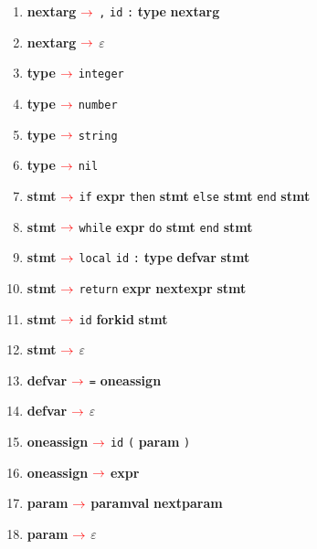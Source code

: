 \documentclass[a4paper, 11pt]{article}
\def\nonterm #1{\boldmath{$<$}\textbf{#1}\boldmath{$>$}\space}
\def\term #1{\texttt{#1}\space}
\newcommand{\arrow} {$\color{red} \rightarrow$\space}
\newcommand{\unsc} {\underline{\hspace{0.2cm}}}
\begin{document}
\begin{enumerate}[label=\textcolor{red}{\arabic*.}]
        \item \nonterm{next\unsc{}arg} \arrow{} \term{,} \term{id} \term{:} \nonterm{type} \nonterm{next\unsc{}arg}

        \item \nonterm{next\unsc{}arg} \arrow{} \term{$\varepsilon$}

        \item \nonterm{type} \arrow{} \term{integer}
        \item \nonterm{type} \arrow{} \term{number}
        \item \nonterm{type} \arrow{} \term{string}
        \item \nonterm{type} \arrow{} \term{nil}

        \item \nonterm{stmt} \arrow{} \term{if} \nonterm{expr} \term{then} \nonterm{stmt} \term{else} \nonterm{stmt} \term{end} \nonterm{stmt}

        \item \nonterm{stmt} \arrow{} \term{while} \nonterm{expr} \term{do} \nonterm{stmt} \term{end} \nonterm{stmt}

        \item \nonterm{stmt} \arrow{} \term{local} \term{id} \term{:} \nonterm{type} \nonterm{def\unsc{}var} \nonterm{stmt}

        \item \nonterm{stmt} \arrow{} \term{return} \nonterm{expr} \nonterm{next\unsc{}expr} \nonterm{stmt}

        \item \nonterm{stmt} \arrow{} \term{id} \nonterm{fork\unsc{}id} \nonterm{stmt}

        \item \nonterm{stmt} \arrow{} \term{$\varepsilon$}

        \item \nonterm{def\unsc{}var} \arrow{} \term{=} \nonterm{one\unsc{}assign}
        \item \nonterm{def\unsc{}var} \arrow{} \term{$\varepsilon$}

        \item \nonterm{one\unsc{}assign} \arrow{} \term{id} \term{(} \nonterm{param} \term{)}
        \item \nonterm{one\unsc{}assign} \arrow{} \nonterm{expr}

        \item \nonterm{param} \arrow{} \nonterm{param\unsc{}val} \nonterm{next\unsc{}param}
        \item \nonterm{param} \arrow{} \term{$\varepsilon$}


\end{enumerate}
\end{document}

